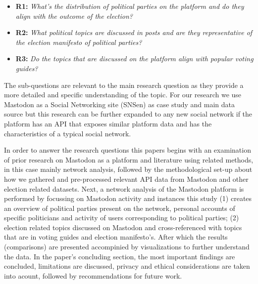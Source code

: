 \begin{itemize}
  \item \textbf{R1:} \textit{What's the distribution of political parties on the platform and do they align with the outcome of the election? }
  \item \textbf{R2:} \textit{What political topics are discussed in posts and are they representative of the election manifesto of political parties? }
  \item \textbf{R3:} \textit{Do the topics that are discussed on the platform align with popular voting guides?}
\end{itemize}

The sub-questions are relevant to the main research question as they provide a more detailed and specific understanding of the topic. For our research we use Mastodon as a Social Networking site (SNSen) as case study and main data source but this research can be further expanded to any new social network if the platform has an API that exposes similar platform data and has the characteristics of a typical social network. 

In order to answer the research questions this papers begins with an examination of prior research on Mastodon as a platform and literature using related methods, in this case mainly network analysis, followed by the methodological set-up about how we gathered and pre-processed relevant API data from Mastodon and other election related datasets. Next, a network analysis of the Mastodon platform is performed by focussing on Mastodon activity and instances this study (1) creates an overview of political parties present on the network, personal accounts of specific politicians and activity of users corresponding to political parties; (2) election related topics discussed on Mastodon and cross-referenced with topics that are in voting guides and election manifesto's. After which the results (comparisons) are presented accompinied by visualizations to further understand the data. In the paper's concluding section, the most important findings are concluded, limitations are discussed, privacy and ethical considerations are taken into acount, followed by recommendations for future work.